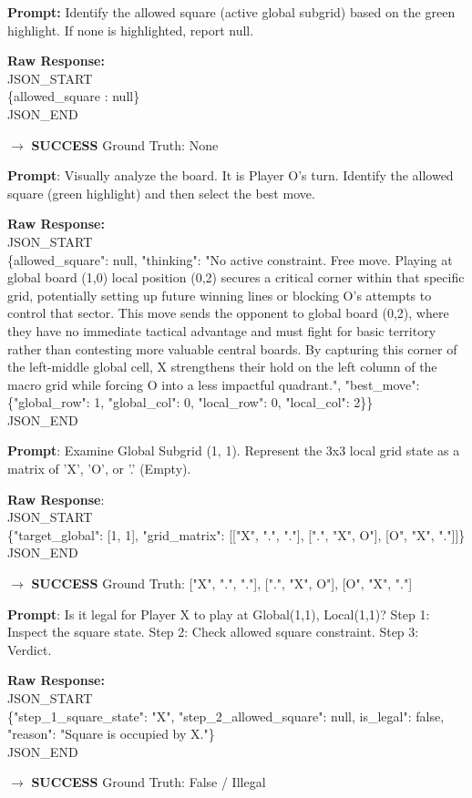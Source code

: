 \documentclass[12pt,a4paper]{article}
\begin{document}
	\begin{description}[leftmargin=3.5cm, style=sameline]
		\item [Allowed Square] \textbf{Prompt:} Identify the allowed square (active global subgrid) based on the green highlight. If none is highlighted, report null.
		\item \textbf{Raw Response:} \\ JSON\_START	\\ \{\dq allowed\_square \dq: null\} \\ JSON\_END
		\item $\rightarrow$ \textbf{SUCCESS} Ground Truth: None
		
		\newpage
		\item [Move] \textbf{Prompt}: Visually analyze the board. It is Player O's turn. Identify the allowed square (green highlight) and then select the best move.
		\item \textbf{Raw Response:} \\ JSON\_START \\ \{\dq allowed\_square": null, "thinking": "No active constraint. Free move. Playing at global board (1,0) local position (0,2) secures a critical corner within that specific grid, potentially setting up future winning lines or blocking O's attempts to control that sector. This move sends the opponent to global board (0,2), where they have no immediate tactical advantage and must fight for basic territory rather than contesting more valuable central boards. By capturing this corner of the left-middle global cell, X strengthens their hold on the left column of the macro grid while forcing O into a less impactful quadrant.", "best\_move": \{"global\_row": 1, "global\_col": 0, "local\_row": 0, "local\_col": 2\}\} \\ JSON\_END
		
		\item [State] \textbf{Prompt}: Examine Global Subgrid (1, 1). Represent the 3x3 local grid state as a matrix of 'X', 'O', or '.' (Empty).
		\item \textbf{Raw Response}: \\ JSON\_START \\ \{"target\_global": [1, 1], "grid\_matrix": [["X", ".", "."], [".", "X", \dq O"], [\dq O", "X", "."]]\} \\ JSON\_END
		\item $\rightarrow$  \textbf{SUCCESS} Ground Truth: ["X", ".", "."], [".", "X", \dq O"], [\dq O", "X", "."]
		\item [Legality] \textbf{Prompt}: Is it legal for Player X to play at Global(1,1), Local(1,1)? Step 1: Inspect the square state. Step 2: Check allowed square constraint. Step 3: Verdict.
		\item \textbf{Raw Response:} \\ JSON\_START \\ \{"step\_1\_square\_state": "X", "step\_2\_allowed\_square": null, \dq is\_legal": false, "reason": "Square is occupied by X."\} \\ JSON\_END
		\item $\rightarrow$  \textbf{SUCCESS} Ground Truth: False / Illegal
	\end{description}
	
\end{document}
